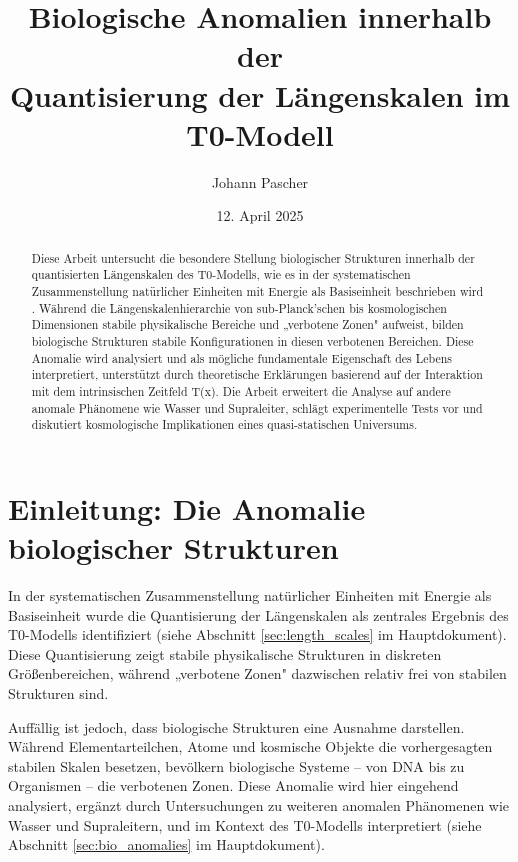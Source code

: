\documentclass[12pt,a4paper]{article}
\title{Biologische Anomalien innerhalb der\\Quantisierung der Längenskalen im T0-Modell}
\author{Johann Pascher}
\date{12. April 2025}
\newcommand{\Tfield}{T(x)}
\begin{document}
	
	\maketitle
	
	\begin{abstract}
		Diese Arbeit untersucht die besondere Stellung biologischer Strukturen innerhalb der quantisierten Längenskalen des T0-Modells, wie es in der systematischen Zusammenstellung natürlicher Einheiten mit Energie als Basiseinheit beschrieben wird \cite{pascher_nateinheiten_2025}. Während die Längenskalenhierarchie von sub-Planck'schen bis kosmologischen Dimensionen stabile physikalische Bereiche und „verbotene Zonen" aufweist, bilden biologische Strukturen stabile Konfigurationen in diesen verbotenen Bereichen. Diese Anomalie wird analysiert und als mögliche fundamentale Eigenschaft des Lebens interpretiert, unterstützt durch theoretische Erklärungen basierend auf der Interaktion mit dem intrinsischen Zeitfeld \Tfield. Die Arbeit erweitert die Analyse auf andere anomale Phänomene wie Wasser und Supraleiter, schlägt experimentelle Tests vor und diskutiert kosmologische Implikationen eines quasi-statischen Universums.
	\end{abstract}
	
	\tableofcontents
	\newpage
	
	\section{Einleitung: Die Anomalie biologischer Strukturen}
	\label{sec:introduction}
	
	In der systematischen Zusammenstellung natürlicher Einheiten mit Energie als Basiseinheit \cite{pascher_nateinheiten_2025} wurde die Quantisierung der Längenskalen als zentrales Ergebnis des T0-Modells identifiziert (siehe Abschnitt \ref{sec:length_scales} im Hauptdokument). Diese Quantisierung zeigt stabile physikalische Strukturen in diskreten Größenbereichen, während „verbotene Zonen" dazwischen relativ frei von stabilen Strukturen sind.
	
	Auffällig ist jedoch, dass biologische Strukturen eine Ausnahme darstellen. Während Elementarteilchen, Atome und kosmische Objekte die vorhergesagten stabilen Skalen besetzen, bevölkern biologische Systeme – von DNA bis zu Organismen – die verbotenen Zonen. Diese Anomalie wird hier eingehend analysiert, ergänzt durch Untersuchungen zu weiteren anomalen Phänomenen wie Wasser und Supraleitern, und im Kontext des T0-Modells interpretiert (siehe Abschnitt \ref{sec:bio_anomalies} im Hauptdokument).
	
\end{document}

